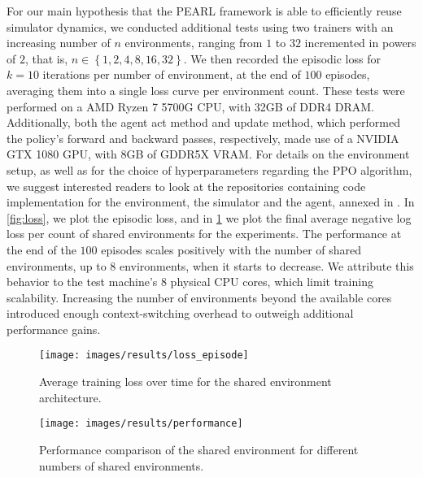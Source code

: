 For our main hypothesis that the PEARL framework is able to efficiently reuse simulator dynamics, we conducted additional tests using two trainers with an
increasing number of $n$ environments, ranging from $1$ to $32$ incremented in powers of $2$, that is, $n \in \left\{1, 2, 4, 8, 16, 32\right\}$.
We then recorded the episodic loss for $k = 10$ iterations per number of environment, at the end of $100$ episodes, averaging them into a single loss curve per environment count.
These tests were performed on a AMD Ryzen 7 5700G CPU, with 32GB of DDR4 DRAM.
Additionally, both the agent act method and update method, which performed the policy's forward and backward passes, respectively,
made use of a NVIDIA GTX 1080 GPU, with 8GB of GDDR5X VRAM.
For details on the environment setup, as well as for the choice of hyperparameters regarding the PPO algorithm,
we suggest interested readers to look at the repositories containing code implementation for the environment,
the simulator and the agent, annexed in .
In \cref{fig:loss}, we plot the episodic loss, and in \cref{fig:performance} we plot the final average negative log loss per count of shared environments for the experiments.
The performance at the end of the $100$ episodes scales positively with the number of shared environments, up to $8$ environments,
when it starts to decrease.
We attribute this behavior to the test machine's $8$ physical CPU cores, which limit training scalability.
Increasing the number of environments beyond the available cores introduced enough context-switching overhead to outweigh additional performance gains.

\begin{figure}[htbp]
    \begin{minipage}[t]{0.48\textwidth}
        \centering
        \texttt{[image: images/results/loss\_episode]}
        \caption{Average training loss over time for the shared environment architecture.}
        \label{fig:loss}
    \end{minipage}
    \hfill
    \begin{minipage}[t]{0.48\textwidth}
        \centering
        \texttt{[image: images/results/performance]}
        \caption{Performance comparison of the shared environment for different numbers of shared environments.}
        \label{fig:performance}
    \end{minipage}
\end{figure}

